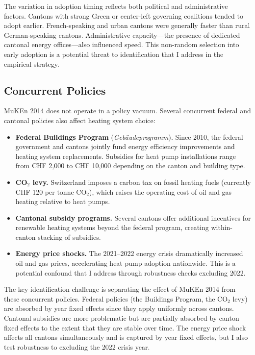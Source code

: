 \documentclass[12pt]{article}
\begin{document}
The variation in adoption timing reflects both political and administrative factors. Cantons with strong Green or center-left governing coalitions tended to adopt earlier. French-speaking and urban cantons were generally faster than rural German-speaking cantons. Administrative capacity---the presence of dedicated cantonal energy offices---also influenced speed. This non-random selection into early adoption is a potential threat to identification that I address in the empirical strategy.

\subsection{Concurrent Policies}

MuKEn 2014 does not operate in a policy vacuum. Several concurrent federal and cantonal policies also affect heating system choice:

\begin{itemize}
    \item \textbf{Federal Buildings Program} (\textit{Geb\"audeprogramm}). Since 2010, the federal government and cantons jointly fund energy efficiency improvements and heating system replacements. Subsidies for heat pump installations range from CHF 2,000 to CHF 10,000 depending on the canton and building type.

    \item \textbf{CO$_2$ levy.} Switzerland imposes a carbon tax on fossil heating fuels (currently CHF 120 per tonne CO$_2$), which raises the operating cost of oil and gas heating relative to heat pumps.

    \item \textbf{Cantonal subsidy programs.} Several cantons offer additional incentives for renewable heating systems beyond the federal program, creating within-canton stacking of subsidies.

    \item \textbf{Energy price shocks.} The 2021--2022 energy crisis dramatically increased oil and gas prices, accelerating heat pump adoption nationwide. This is a potential confound that I address through robustness checks excluding 2022.
\end{itemize}

The key identification challenge is separating the effect of MuKEn 2014 from these concurrent policies. Federal policies (the Buildings Program, the CO$_2$ levy) are absorbed by year fixed effects since they apply uniformly across cantons. Cantonal subsidies are more problematic but are partially absorbed by canton fixed effects to the extent that they are stable over time. The energy price shock affects all cantons simultaneously and is captured by year fixed effects, but I also test robustness to excluding the 2022 crisis year.
\end{document}

